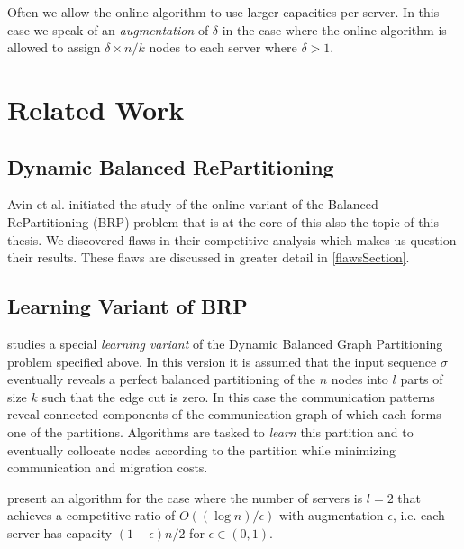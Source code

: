 \documentclass[a4paper,xcolor=dvipsnames, tikz, 12pt]{article}
\newcommand{\nl}{\newline}
\newcommand{\crep}{C{\scriptsize REP}}
\theoremstyle{definition}
\begin{document}
	Often we allow the online algorithm to use larger capacities per server. In this case we speak of an \textit{augmentation} of $\delta$ in the case where the online algorithm is allowed to assign $\delta\times n/k$ nodes to each server where $\delta>1$.%
	
	\section{Related Work}
	\subsection{Dynamic Balanced RePartitioning}
	Avin et al.\cite{Avin2015a} initiated the study of the online variant of the Balanced RePartitioning (BRP) problem that is at the core of this also the topic of this thesis. We discovered flaws in their competitive analysis which makes us question their results. These flaws are discussed in greater detail in \cref{flawsSection}. %
	
	\subsection{Learning Variant of BRP}
	\cite{Henzinger2019} studies a special \textit{learning variant} of the Dynamic Balanced Graph Partitioning problem specified above. In this version it is assumed that the input sequence $\sigma$ eventually reveals a perfect balanced partitioning of the $n$ nodes into $l$ parts of size $k$ such that the edge cut is zero. In this case the communication patterns reveal connected components of the communication graph of which each forms one of the partitions. Algorithms are tasked to \textit{learn} this partition and to eventually collocate nodes according to the partition while minimizing communication and migration costs.
	
	\cite{Henzinger2019} present an algorithm for the case where the number of servers is $l=2$ that achieves a competitive ratio of $O((\log n)/\epsilon)$ with augmentation $\epsilon$, i.e. each server has capacity $(1+\epsilon)n/2$ for $\epsilon\in(0,1)$.
	
\end{document}
